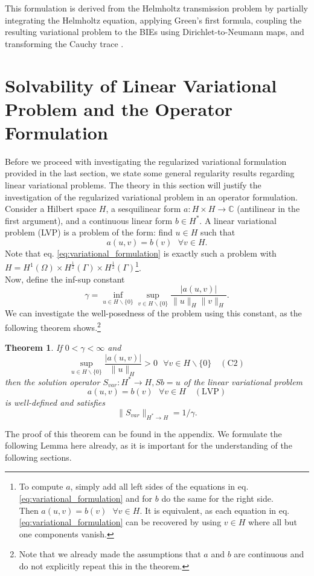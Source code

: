 \documentclass[12pt,journal,compsoc, onecolumn]{IEEEtran}
\newtheorem{theorem}{Theorem}[section]
\begin{document}
This formulation is derived from the Helmholtz transmission problem by partially integrating the Helmholtz equation, 
applying Green's first formula, coupling the resulting variational problem to 
the BIEs using Dirichlet-to-Neumann maps, and transforming the Cauchy trace \cite{meury2007stable}. 


\section{Solvability of Linear Variational Problem and the Operator Formulation}
\label{section:solvability}
Before we proceed with investigating the regularized variational formulation provided in the last section, we state some general regularity results regarding linear variational problems. The theory  in this section will justify the investigation of the regularized variational problem in an operator formulation.
\\ 
Consider a Hilbert space $H$, a sesquilinear form $a: H \times H \rightarrow \mathbb{C}$ (antilinear in the first argument), and a continuous linear form $b \in H^*$. A linear variational problem (LVP) is a problem of the form: find $u \in H$ such that
$$
a(u, v) = b(v) \text{ } \forall v \in H. 
$$
Note that eq. \ref{eq:variational_formulation} is exactly such a problem with $H = H^{1}(\Omega) \times H^{\frac{1}{2}}(\Gamma) \times H^{\frac{1}{2}}(\Gamma)$\footnote{To compute $a$, simply add all left sides of the equations in eq. \ref{eq:variational_formulation} and for $b$ do the same for the right side. \\ Then $a(u, v) = b(v) \text{ }\forall v \in H$. It is equivalent, as each equation in eq. \ref{eq:variational_formulation} can be recovered by using $v \in H$ where all but one components vanish.}. \\
Now, define the inf-sup constant
$$
\gamma = \inf\limits_{u\in H \backslash \{0\}}\sup\limits_{v\in H\backslash \{0\}} \frac{|a(u, v)|}{\|u\|_H \|v\|_H}.
$$
We can investigate the well-posedness of the problem using this constant, as the following theorem shows.\footnote{Note that we already made the assumptions that $a$ and $b$ are continuous and do not explicitly repeat this in the theorem.}
\begin{theorem}
\label{thm:variational_perspective}
If $0 < \gamma < \infty$ and $$\sup\limits_{u \in H \backslash\{0\}} \frac{|{a}(u, v)|}{\|u\|_{H}}>0 \text{ } \forall v \in H \backslash \{0\} \quad \mathrm{ (C2)}$$ then the solution operator $S_{var}: H^* \rightarrow H, Sb = u$ of the linear variational problem
$$
a(u,v) = b(v)\text{ }  \forall v \in H \quad \mathrm{ (LVP)}
$$
is well-defined and satisfies 
$$
\|S_{var}\|_{H^* \rightarrow H}=1 / \gamma.
$$
\end{theorem}
\noindent The proof of this theorem can be found in the appendix. We formulate the following Lemma here already, as it is important for the understanding of the following sections.
\end{document}
